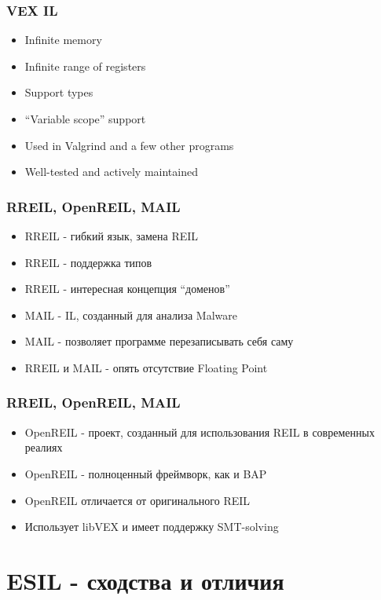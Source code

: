 \documentclass[10pt,pdf,utf8,english,compress,hyperref={unicode}]{beamer}
\begin{document}
\begin{frame}[fragile]
  \frametitle{VEX IL}
  \begin{itemize}
  \item Infinite memory
  \item Infinite range of registers
  \item Support types
  \item ``Variable scope'' support
  \item Used in Valgrind and a few other programs
  \item Well-tested and actively maintained
  \end{itemize}
\end{frame}

\begin{frame}[fragile]
  \frametitle{RREIL, OpenREIL, MAIL}
  \begin{itemize}
  \item RREIL  - гибкий язык, замена REIL
  \item RREIL - поддержка типов
  \item RREIL - интересная концепция ``доменов''
  \item MAIL - IL, созданный для анализа Malware
  \item MAIL - позволяет программе перезаписывать себя саму
  \item RREIL и MAIL - опять отсутствие Floating Point
  \end{itemize}
\end{frame}

\begin{frame}[fragile]
  \frametitle{RREIL, OpenREIL, MAIL}
  \begin{itemize}
  \item OpenREIL  - проект, созданный для использования REIL в современных реалиях
  \item OpenREIL - полноценный фреймворк, как и BAP
  \item OpenREIL отличается от оригинального REIL
  \item Использует libVEX и имеет поддержку SMT-solving
  \end{itemize}
\end{frame}


\section{ESIL - сходства и отличия}
\end{document}
